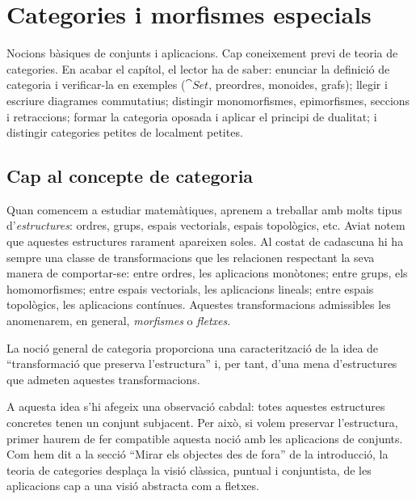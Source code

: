 \chapter[Categories]{Categories i morfismes especials}
\label{cap:categories}

\begin{objectius}
 Nocions bàsiques de conjunts i aplicacions. Cap coneixement previ de teoria de categories.
 En acabar el capítol, el lector ha de saber: enunciar la definició de categoria i verificar-la en exemples ($\cat{Set}$, preordres, monoides, grafs); llegir i escriure diagrames commutatius; distingir monomorfismes, epimorfismes, seccions i retraccions; formar la categoria oposada i aplicar el principi de dualitat; i distingir categories petites de localment petites.
\end{objectius}

\section{Cap al concepte de categoria}

Quan comencem a estudiar matemàtiques, aprenem a treballar amb molts tipus d'\emph{estructures}: ordres, grups, espais vectorials, espais topològics, etc. Aviat notem que aquestes estructures rarament apareixen soles. Al costat de cadascuna hi ha sempre una classe de transformacions que les relacionen respectant la seva manera de comportar-se: entre ordres, les aplicacions monòtones; entre grups, els homomorfismes; entre espais vectorials, les aplicacions lineals; entre espais topològics, les aplicacions contínues. Aquestes transformacions admissibles les anomenarem, en general, \emph{morfismes} o \emph{fletxes}.

La noció general de categoria proporciona una caracterització de la idea de \enquote{transformació que preserva l'estructura} i, per tant, d'una mena d'estructures que admeten aquestes transformacions.

A aquesta idea s'hi afegeix una observació cabdal: totes aquestes estructures concretes tenen un conjunt subjacent. Per això, si volem preservar l'estructura, primer haurem de fer compatible aquesta noció amb les aplicacions de conjunts. Com hem dit a la secció \enquote{Mirar els objectes des de fora} de la introducció, la teoria de categories desplaça la visió clàssica, puntual i conjuntista, de les aplicacions cap a una visió abstracta com a fletxes.

